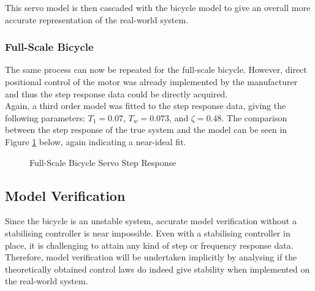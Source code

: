 This servo model is then cascaded with the bicycle model to give an overall more accurate representation of the real-world system.

\subsubsection{Full-Scale Bicycle}
The same process can now be repeated for the full-scale bicycle. However, direct positional control of the motor was already implemented by the manufacturer and thus the step response data could be directly acquired. \\
Again, a third order model was fitted to the step response data, giving the following parameters: $T_1 = 0.07$, $T_w = 0.073$, and $\zeta = 0.48$. The comparison between the step response of the true system and the model can be seen in Figure \ref{fig:FSServoModel} below, again indicating a near-ideal fit. 

\begin{figure}[H]
	\centering
	\caption{Full-Scale Bicycle Servo Step Response}
	\label{fig:FSServoModel}
\end{figure}

\subsection{Model Verification}
Since the bicycle is an unstable system, accurate model verification without a stabilising controller is near impossible. Even with a stabilising controller in place, it is challenging to attain any kind of step or frequency response data. Therefore, model verification will be undertaken implicitly by analysing if the theoretically obtained control laws do indeed give stability when implemented on the real-world system.